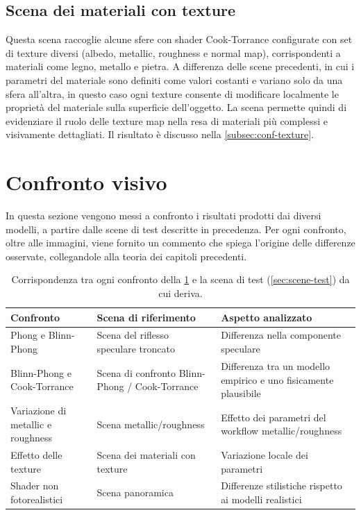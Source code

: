\documentclass[12pt,a4paper,twoside]{book}
\begin{document}
\subsection{Scena dei materiali con texture}
\label{subsec:scena-texture}

Questa scena raccoglie alcune sfere con shader Cook-Torrance configurate con set di texture diversi (albedo, metallic, roughness e normal map), corrispondenti a materiali come legno, metallo e pietra. A differenza delle scene precedenti, in cui i parametri del materiale sono definiti come valori costanti e variano solo da una sfera all'altra, in questo caso ogni texture consente di modificare localmente le proprietà del materiale sulla superficie dell'oggetto. La scena permette quindi di evidenziare il ruolo delle texture map nella resa di materiali più complessi e visivamente dettagliati. Il risultato è discusso nella \cref{subsec:conf-texture}.

\section{Confronto visivo}
\label{sec:confronto-visivo}

In questa sezione vengono messi a confronto i risultati prodotti dai diversi modelli, a partire dalle scene di test descritte in precedenza. Per ogni confronto, oltre alle immagini, viene fornito un commento che spiega l'origine delle differenze osservate, collegandole alla teoria dei capitoli precedenti.

\begin{table}[H]
    \centering
    \small
    \begin{tabular}{p{4cm} p{4.3cm} p{4.3cm}}
        \hline
        \textbf{Confronto} & \textbf{Scena di riferimento} & \textbf{Aspetto analizzato}\\
        \hline
        Phong e Blinn-Phong & Scena del riflesso speculare troncato & Differenza nella componente speculare \\
        \hline
        Blinn-Phong e Cook-Torrance & Scena di confronto Blinn-Phong / Cook-Torrance & Differenza tra un modello empirico e uno fisicamente plausibile \\
        \hline
        Variazione di metallic e roughness & Scena metallic/roughness & Effetto dei parametri del workflow metallic/roughness \\
        \hline
        Effetto delle texture & Scena dei materiali con texture & Variazione locale dei parametri \\
        \hline
        Shader non fotorealistici & Scena panoramica & Differenze stilistiche rispetto ai modelli realistici \\
        \hline
    \end{tabular}
    \caption[Corrispondenza tra confronti visivi e scene di test]{Corrispondenza tra ogni confronto della \cref{sec:confronto-visivo} e la scena di test (\cref{sec:scene-test}) da cui deriva.}
    \label{tab:raccordo}
\end{table}
\end{document}
